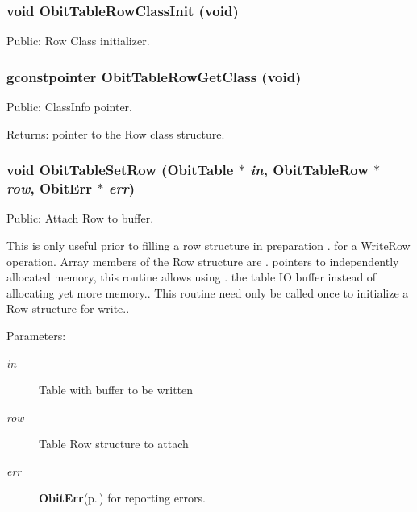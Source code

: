 \subsubsection{\setlength{\rightskip}{0pt plus 5cm}void Obit\-Table\-Row\-Class\-Init (void)}\label{ObitTable_8h_a25}


Public: Row Class initializer. 

\subsubsection{\setlength{\rightskip}{0pt plus 5cm}gconstpointer Obit\-Table\-Row\-Get\-Class (void)}\label{ObitTable_8h_a27}


Public: Class\-Info pointer. 

\begin{Desc}
\item[Returns:]pointer to the Row class structure. \end{Desc}
\subsubsection{\setlength{\rightskip}{0pt plus 5cm}void Obit\-Table\-Set\-Row ({\bf Obit\-Table} $\ast$ {\em in}, {\bf Obit\-Table\-Row} $\ast$ {\em row}, {\bf Obit\-Err} $\ast$ {\em err})}\label{ObitTable_8h_a43}


Public: Attach Row to buffer. 

This is only useful prior to filling a row structure in preparation . for a Write\-Row operation. Array members of the Row structure are . pointers to independently allocated memory, this routine allows using . the table IO buffer instead of allocating yet more memory.. This routine need only be called once to initialize a Row structure for write.. \begin{Desc}
\item[Parameters:]
\begin{description}
\item[{\em in}]Table with buffer to be written \item[{\em row}]Table Row structure to attach \item[{\em err}]{\bf Obit\-Err}{\rm (p.\,\pageref{structObitErr})} for reporting errors. \end{description}
\end{Desc}
